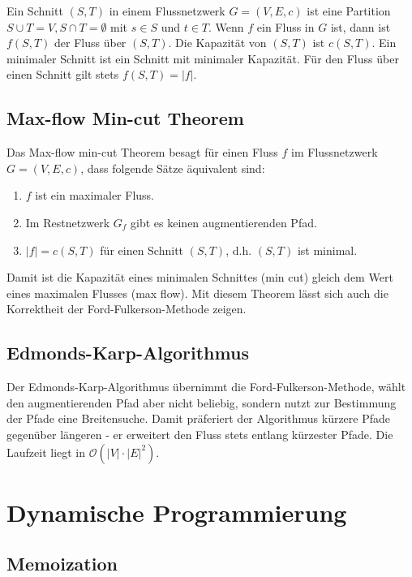 \documentclass[12pt]{article}
\begin{document}
Ein Schnitt $(S, T)$ in einem Flussnetzwerk $G= (V, E, c)$ ist eine Partition $S \cup T = V, S \cap T = \emptyset$ mit $s \in S$ und $t \in T$. Wenn $f$ ein Fluss in $G$ ist, dann ist $f(S, T)$ der Fluss über $(S, T)$. Die Kapazität von $(S, T)$ ist $c(S, T)$. Ein minimaler Schnitt ist ein Schnitt mit minimaler Kapazität. Für den Fluss über einen Schnitt gilt stets $f(S, T) = |f|$.

\subsection{Max-flow Min-cut Theorem}

Das Max-flow min-cut Theorem besagt für einen Fluss $f$ im Flussnetzwerk $G=(V,E,c)$, dass folgende Sätze äquivalent sind:

\begin{enumerate}
\item $f$ ist ein maximaler Fluss.
\item Im Restnetzwerk $G_f$ gibt es keinen augmentierenden Pfad.
\item $|f| = c(S, T)$ für einen Schnitt $(S, T)$, d.h. $(S, T)$ ist minimal.
\end{enumerate}

Damit ist die Kapazität eines minimalen Schnittes (min cut) gleich dem Wert eines maximalen Flusses (max flow). Mit diesem Theorem lässt sich auch die Korrektheit der Ford-Fulkerson-Methode zeigen.

\subsection{Edmonds-Karp-Algorithmus}

Der Edmonds-Karp-Algorithmus übernimmt die Ford-Fulkerson-Methode, wählt den augmentierenden Pfad aber nicht beliebig, sondern nutzt zur Bestimmung der Pfade eine Breitensuche. Damit präferiert der Algorithmus kürzere Pfade gegenüber längeren - er erweitert den Fluss stets entlang kürzester Pfade. Die Laufzeit liegt in $\mathcal O(|V|\cdot|E|^2)$.

\section{Dynamische Programmierung}

\subsection{Memoization}
\end{document}

